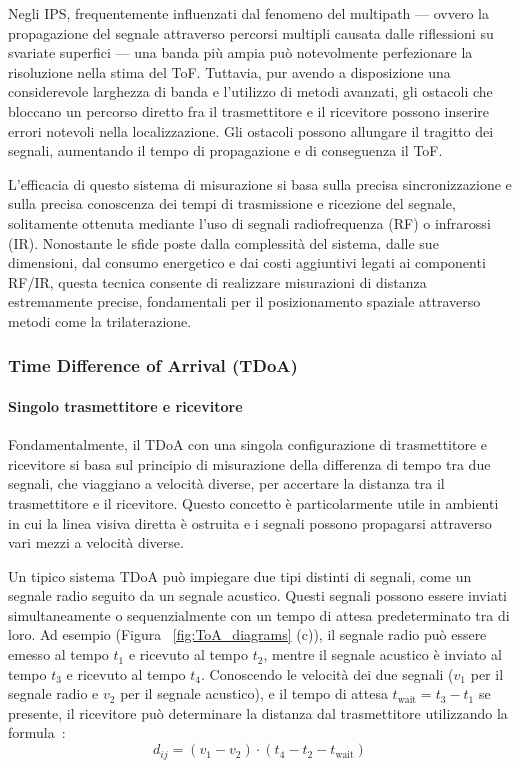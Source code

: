 Negli IPS, frequentemente influenzati dal fenomeno del multipath — ovvero la propagazione del segnale attraverso percorsi multipli causata dalle riflessioni su svariate superfici — una banda più ampia può notevolmente perfezionare la risoluzione nella stima del ToF. Tuttavia, pur avendo a disposizione una considerevole larghezza di banda e l'utilizzo di metodi avanzati, gli ostacoli che bloccano un percorso diretto fra il trasmettitore e il ricevitore possono inserire errori notevoli nella localizzazione. Gli ostacoli possono allungare il tragitto dei segnali, aumentando il tempo di propagazione e di conseguenza il ToF.

L'efficacia di questo sistema di misurazione si basa sulla precisa sincronizzazione e sulla precisa conoscenza dei tempi di trasmissione e ricezione del segnale, solitamente ottenuta mediante l'uso di segnali radiofrequenza (RF) o infrarossi (IR). Nonostante le sfide poste dalla complessità del sistema, dalle sue dimensioni, dal consumo energetico e dai costi aggiuntivi legati ai componenti RF/IR, questa tecnica consente di realizzare misurazioni di distanza estremamente precise, fondamentali per il posizionamento spaziale attraverso metodi come la trilaterazione.

\subsubsection{Time Difference of Arrival (TDoA)}


\paragraph{Singolo trasmettitore e ricevitore}

Fondamentalmente, il TDoA con una singola configurazione di trasmettitore e ricevitore si basa sul principio di misurazione della differenza di tempo tra due segnali, che viaggiano a velocità diverse, per accertare la distanza tra il trasmettitore e il ricevitore. Questo concetto è particolarmente utile in ambienti in cui la linea visiva diretta è ostruita e i segnali possono propagarsi attraverso vari mezzi a velocità diverse.

Un tipico sistema TDoA può impiegare due tipi distinti di segnali, come un segnale radio seguito da un segnale acustico. Questi segnali possono essere inviati simultaneamente o sequenzialmente con un tempo di attesa predeterminato tra di loro. Ad esempio (Figura ~\ref{fig:ToA_diagrams} (c)), il segnale radio può essere emesso al tempo \( t_1 \) e ricevuto al tempo \( t_2 \), mentre il segnale acustico è inviato al tempo \( t_3 \) e ricevuto al tempo \( t_4 \). Conoscendo le velocità dei due segnali (\( v_1 \) per il segnale radio e \( v_2 \) per il segnale acustico), e il tempo di attesa \( t_{\text{wait}} = t_3 - t_1 \) se presente, il ricevitore può determinare la distanza dal trasmettitore utilizzando la formula~\cite{Dargie2010FundamentalsWS}:
\begin{equation}
    d_{ij} = (v_1 - v_2) \cdot (t_4 - t_2 - t_{\text{wait}})
\end{equation}

